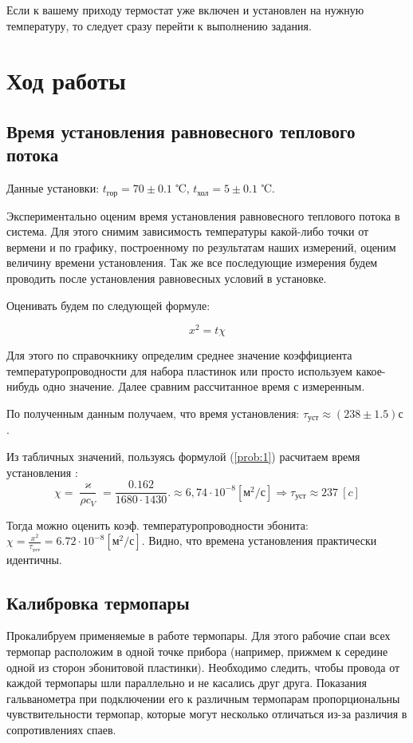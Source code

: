 \documentclass[a4paper,11.5pt]{article} %
\begin{document}
Если к вашему приходу термостат уже включен и установлен на нужную температуру, то следует сразу перейти к выполнению задания.

\section{Ход работы}

\subsection{Время установления равновесного теплового потока}

Данные установки: $t_{\text{гор}} = 70 \pm 0.1$ ℃, $t_{\text{хол}} = 5 \pm 0.1$ ℃.

Экспериментально оценим время установления равновесного теплового потока в система. Для этого снимим зависимость температуры какой-либо точки от вермени и по графику, построенному по результатам наших измерений, оценим величину времени установления. Так же все последующие измерения будем проводить после установления равновесных условий в установке.

Оценивать будем по следующей формуле:

\begin{equation}
	x^2 = t \chi
	\label{prob:1}
\end{equation}

Для этого по справочкнику определим среднее значение коэффициента температуропроводности для набора пластинок или просто используем какое-нибудь одно значение. Далее сравним рассчитанное время с измеренным.

По полученным данным получаем, что время установления: $\tau_{\text{уст}} \approx (238 \pm 1.5)  \text{с}$ .

Из табличных значений, пользуясь формулой (\ref{prob:1}) расчитаем время установления :
\[ \chi = \frac{\varkappa}{\rho c_V} = \frac{0.162}{1680 \cdot 1430} . \approx 6,74 \cdot 10^{-8} [\text{м}^2 / \text{с}] \Rightarrow \tau_{\text{уст}} \approx 237\ [c]\]

Тогда можно оценить коэф. температуропроводности эбонита: $\chi = \frac{x^2}{\tau_{\text{уст}}} = 6.72 \cdot 10^{-8} [\text{м}^2 / \text{с}]$. Видно, что времена установления практически идентичны.
\subsection{Калибровка термопары}

Прокалибруем применяемые в работе термопары. Для этого рабочие спаи всех термопар расположим в одной точке прибора (например, прижмем к середине одной из сторон эбонитовой пластинки). Необходимо следить, чтобы провода от каждой термопары шли параллельно и не касались друг друга. Показания гальванометра при подключении его к различным термопарам пропорциональны чувствительности термопар, которые могут несколько отличаться из-за различия в сопротивлениях спаев.
\end{document}
